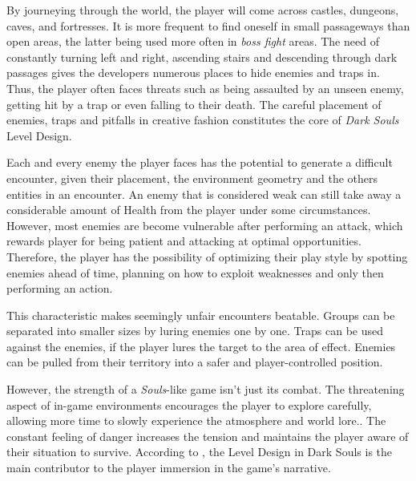 By journeying through the world, the player will come across castles, dungeons, caves, and fortresses. It is more frequent to find oneself in small passageways than open areas, the latter being used more often in \emph{boss fight} areas. The need of constantly turning left and right, ascending stairs and descending through dark passages gives the developers numerous places to hide enemies and traps in. Thus, the player often faces threats such as being assaulted by an unseen enemy, getting hit by a trap or even falling to their death.  The careful placement of enemies, traps and pitfalls in creative fashion constitutes the core of \emph{Dark Souls} Level Design.

Each and every enemy the player faces has the potential to generate a difficult encounter, given their placement, the environment geometry and the others entities in an encounter. An enemy that is considered weak can still take away a considerable amount of Health from the player under some circumstances. However, most enemies are become vulnerable after performing an attack, which rewards player for being patient and attacking at optimal opportunities. Therefore, the player has the possibility of optimizing their play style by spotting enemies ahead of time, planning on how to exploit weaknesses and only then performing an action.

This characteristic makes seemingly unfair encounters beatable. Groups can be separated into smaller sizes by luring enemies one by one. Traps can be used against the enemies, if the player lures the target to the area of effect. Enemies can be pulled from their territory into a safer and player-controlled position.

However, the strength of a \emph{Souls}-like game isn't just its combat. The threatening aspect of in-game environments encourages the player to explore carefully, allowing more time to slowly experience the atmosphere and world lore.. The constant feeling of danger increases the tension and maintains the player aware of their situation to survive. According to , the Level Design in  Dark Souls is the main contributor to the player immersion in the game's narrative.



